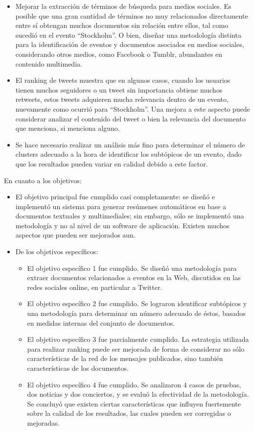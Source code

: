 \documentclass[upright, contnum]{umemoria}
\begin{document}
\begin{itemize}
\item Mejorar la extracción de términos de búsqueda para medios
  sociales. Es posible que una gran cantidad de términos no muy
  relacionados directamente entre sí obtengan muchos documentos sin
  relación entre ellos, tal como sucedió en el evento ``Stockholm''. O
  bien, diseñar una metodología distinta para la identificación de
  eventos y documentos asociados en medios sociales, considerando
  otros medios, como Facebook o Tumblr, abundantes en contenido
  multimedia.
\item El ranking de tweets muestra que en algunos casos, cuando los
  usuarios tienen muchos seguidores o un tweet sin importancia obtiene
  muchos retweets, estos tweets adquieren mucha relevancia dentro de
  un evento, nuevamente como ocurrió para ``Stockholm''. Una mejora a
  este aspecto puede considerar analizar el contenido del tweet o bien
  la relevancia del documento que menciona, si menciona alguno.
\item Se hace necesario realizar un análisis más fino para determinar el
  número de clusters adecuado a la hora de identificar los subtópicos
  de un evento, dado que los resultados pueden variar en calidad
  debido a este factor.
\end{itemize}
En cuanto a los objetivos:
\begin{itemize}
\item El objetivo principal fue cumplido casi completamente: se diseñó e
  implementó un sistema para generar resúmenes automáticos en base a
  documentos textuales y multimediales; sin embargo, sólo se
  implementó una metodología y no al nivel de un software de
  aplicación. Existen muchos aspectos que pueden ser mejorados aun.
\item De los objetivos específicos:

\begin{itemize}
\item El objetivo específico 1 fue cumplido. Se diseñó una metodología
    para extraer documentos relacionados a eventos en la Web,
    discutidos en las redes sociales online, en particular a Twitter.
\item El objetivo específico 2 fue cumplido. Se lograron identificar
    subtópicos y una metodología para determinar un número adecuado de
    éstos, basados en medidas internas del conjunto de documentos.
\item El objetivo específico 3 fue parcialmente cumplido. La estrategia
    utilizada para realizar ranking puede ser mejorada de forma de
    considerar no sólo características de la red de los mensajes
    publicados, sino también características de los documentos.
\item El objetivo específico 4 fue cumplido. Se analizaron 4 casos de
    pruebas, dos noticias y dos conciertos, y se evaluó la efectividad
    de la metodología. Se concluyó que existen ciertas características
    que influyen fuertemente sobre la calidad de los resultados, las
    cuales pueden ser corregidas o mejoradas.
\end{itemize}

\end{itemize}
\end{document}

